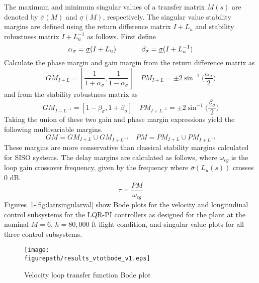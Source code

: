 \documentclass[]{../sty/aiaa-tc}
\newcommand{\figurepath}{../fig}
\begin{document}
  The maximum and minimum singular values of a transfer matrix $M(s)$ are denoted by $\overline{\sigma}(M)$ and $\underline{\sigma}(M)$, respectively.
  The singular value stability margins are defined using the return difference matrix $I+L_{u}$ and stability robustness matrix $I+L_{u}^{-1}$ as follows.
  First define
  \begin{equation*}
    \alpha_{\sigma}=\underline{\sigma}(I+L_{u})
    \hspace{0.5in}
    \beta_{\sigma}=\underline{\sigma}(I+L_{u}^{-1})
  \end{equation*}
  Calculate the phase margin and gain margin from the return difference matrix as
  \begin{equation}
    GM_{I+L}=\left[\frac{1}{1+\alpha_{\sigma}},\frac{1}{1-\alpha_{\sigma}}\right]\quad
    PM_{I+L}=\pm2\sin^{-1}\biggr(\frac{\alpha_{\sigma}}{2}\biggr)
  \end{equation}
  and from the stability robustness matrix as
  \begin{equation}
    GM_{I+L^{-1}}=\left[1-\beta_{\sigma},1+\beta_{\sigma}\right]\quad
    PM_{I+L^{-1}}=\pm2\sin^{-1}\biggr(\frac{\beta_{\sigma}}{2}\biggr)
  \end{equation}
  Taking the union of these two gain and phase margin expressions yield the following multivariable margins.
  \begin{equation}
    GM=GM_{I+L}\cup GM_{I+L^{-1}}\quad
    PM=PM_{I+L}\cup PM_{I+L^{-1}}
  \end{equation}
  These margins are more conservative than classical stability margins calculated for SISO systems.
  The delay margins are calculated as follows, where $\omega_{cg}$ is the loop gain crossover frequency, given by the frequency where $\overline{\sigma}(L_{u}(s))$ crosses 0 dB.
  \begin{equation*}
    \tau=\frac{PM}{\omega_{cg}}
  \end{equation*}
  Figures~\ref{fig:velbode}-\ref{fig:latrsingularval} show Bode plots for the velocity and longitudinal control subsystems for the LQR-PI controllers as designed for the plant at the nominal $M=6$, $h=80,000$ ft flight condition, and singular value plots for all three control subsystems.

  \begin{figure}[H]
    \begin{center}
      \texttt{[image: \\figurepath/results\_vtotbode\_v1.eps]}
      \caption{Velocity loop transfer function Bode plot\label{fig:velbode}}
    \end{center}
  \end{figure}
\end{document}

